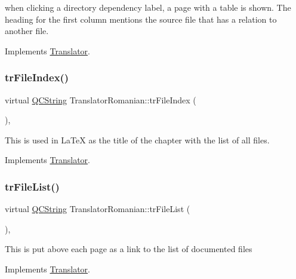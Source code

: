 when clicking a directory dependency label, a page with a table is shown. The heading for the first column mentions the source file that has a relation to another file. 

Implements \mbox{\hyperlink{class_translator}{Translator}}.

\mbox{\label{class_translator_romanian_a10d728158fa6de1ed4ef0ba51b712393}} 
\subsubsection{\texorpdfstring{trFileIndex()}{trFileIndex()}}
{\footnotesize\ttfamily virtual \mbox{\hyperlink{class_q_c_string}{Q\+C\+String}} Translator\+Romanian\+::tr\+File\+Index (\begin{DoxyParamCaption}{ }\end{DoxyParamCaption})\hspace{0.3cm}{\ttfamily [inline]}, {\ttfamily [virtual]}}

This is used in La\+TeX as the title of the chapter with the list of all files. 

Implements \mbox{\hyperlink{class_translator}{Translator}}.

\mbox{\label{class_translator_romanian_a1e1020e3c36eb8e92073fc8a6e4c4436}} 
\subsubsection{\texorpdfstring{trFileList()}{trFileList()}}
{\footnotesize\ttfamily virtual \mbox{\hyperlink{class_q_c_string}{Q\+C\+String}} Translator\+Romanian\+::tr\+File\+List (\begin{DoxyParamCaption}{ }\end{DoxyParamCaption})\hspace{0.3cm}{\ttfamily [inline]}, {\ttfamily [virtual]}}

This is put above each page as a link to the list of documented files 

Implements \mbox{\hyperlink{class_translator}{Translator}}.

\mbox{\label{class_translator_romanian_a4e16e2c96e1ae733f7c6eca8eb19c2e9}} 
